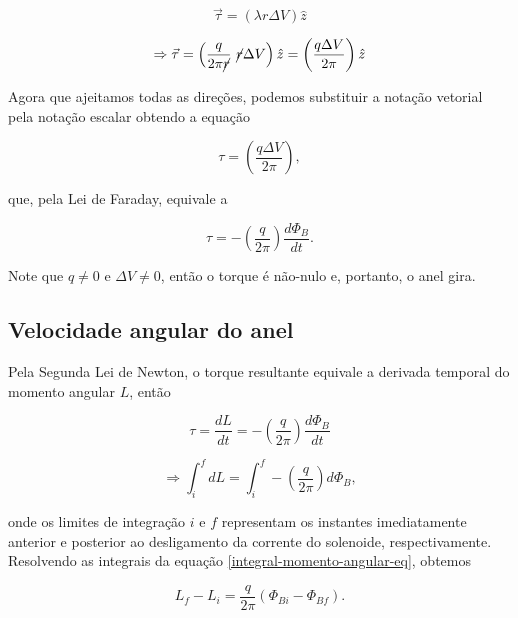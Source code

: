 \documentclass[
	article,
	11pt,
	oneside,
	a4paper,
	english,
	brazil,
	sumario=tradicional
	]{abntex2}
\begin{document}
\begin{equation}
    \vec{\tau} = \left(\lambda r \Delta V \right) \hat{z}
\end{equation}

\begin{equation}
    \Rightarrow \vec{\tau} = \left(\frac{q}{2\pi \cancel{r}}~\cancel{r} \Delta V \right) \hat{z} = \left(\frac{q \Delta V}{2\pi}\right) \hat{z}
\end{equation}

Agora que ajeitamos todas as direções, podemos substituir a notação vetorial pela notação escalar obtendo a equação

\begin{equation}
    \tau =  \left(\frac{q \Delta V}{2\pi}\right),
\end{equation}

\noindent que, pela Lei de Faraday, equivale a

\begin{equation}
    \tau =  - \left(\frac{q}{2\pi}\right)\frac{d \Phi_B}{d t}.
\end{equation}

Note que $q \ne 0$ e $\Delta V \ne 0$, então o torque é não-nulo e, portanto, o anel gira.

\subsection{Velocidade angular do anel}
Pela Segunda Lei de Newton, o torque resultante equivale a derivada temporal do momento angular $L$, então

\begin{equation}
    \tau = \frac{dL}{dt} =  - \left(\frac{q}{2\pi}\right)\frac{d\Phi_B}{dt}
\end{equation}

\begin{equation} \label{integral-momento-angular-eq}
    \Rightarrow \int_i^f dL = \int_i^f - \left(\frac{q}{2\pi}\right) d\Phi_B,
\end{equation}

\noindent onde os limites de integração $i$ e $f$ representam os instantes imediatamente anterior e posterior ao desligamento da corrente do solenoide, respectivamente. Resolvendo as integrais da equação \ref{integral-momento-angular-eq}, obtemos

\begin{equation}
    L_f - L_i = \frac{q}{2\pi}(\Phi_{Bi} - \Phi_{Bf}).
\end{equation}
\end{document}
